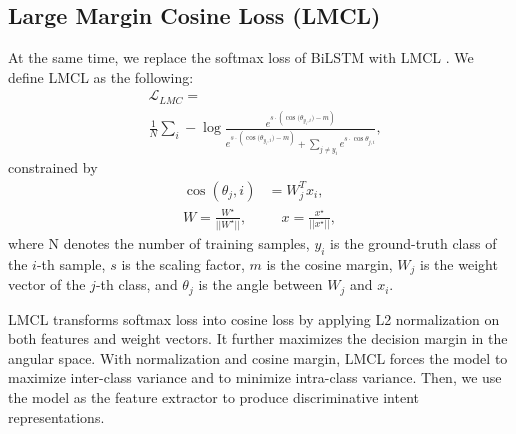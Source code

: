 \documentclass[11pt,a4paper]{article}
\begin{document}
\subsection{Large Margin Cosine Loss (LMCL)}
At the same time, we replace the softmax loss of BiLSTM with LMCL \cite{2018arXiv181009136N}. We define LMCL as the following:
\begin{align}
&\mathcal{L}_{LMC} = \nonumber \\ 
&\frac{1}{N} \sum_{i} - \log \frac{e^{s \cdot  ({\cos{(\theta_{y_i,i}})}-m)}}{e^{s \cdot ({\cos{(\theta_{y_i,i}})-m})} + \sum_{j \neq y_i} e^{s \cdot \cos{\theta_{j,i}}}},
\end{align}
constrained by  
\begin{align}
 \cos(\theta_j, i) &= W_j^Tx_i , \nonumber \\ 
   W = \frac{W^\star}{||W^\star||}, & \quad  x = \frac{x^\star}{||x^\star||}, 
\end{align}
where N denotes the number of training samples, $y_i$ is the ground-truth class of the $i$-th sample, $s$ is the scaling factor, $m$ is the cosine margin, $W_j$ is the weight vector of the $j$-th class, and $\theta_j$ is the angle between $W_j$ and $x_i$.

LMCL transforms softmax loss into cosine loss by applying L2 normalization on both features and weight vectors. It further maximizes the decision margin in the angular space. With normalization and cosine margin, LMCL forces the model to maximize inter-class variance and to minimize intra-class variance. Then, we use the model as the feature extractor to produce discriminative intent representations.
\end{document}
